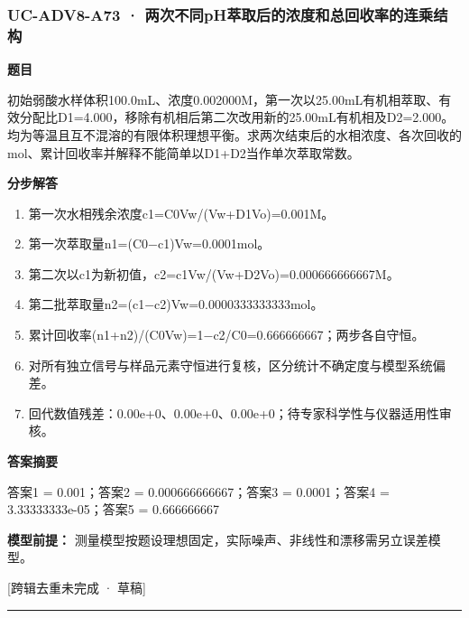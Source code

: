 \documentclass[UTF8,11pt,a4paper]{ctexart}
\begin{document}
\subsubsection*{UC-ADV8-A73 · 两次不同pH萃取后的浓度和总回收率的连乘结构}
\noindent\textbf{题目}\par
初始弱酸水样体积100.0mL、浓度0.002000M，第一次以25.00mL有机相萃取、有效分配比D1=4.000，移除有机相后第二次改用新的25.00mL有机相及D2=2.000。均为等温且互不混溶的有限体积理想平衡。求两次结束后的水相浓度、各次回收的mol、累计回收率并解释不能简单以D1+D2当作单次萃取常数。\par
\medskip\noindent\textbf{分步解答}
\begin{enumerate}
\item 第一次水相残余浓度c1=C0Vw/(Vw+D1Vo)=0.001M。
\item 第一次萃取量n1=(C0−c1)Vw=0.0001mol。
\item 第二次以c1为新初值，c2=c1Vw/(Vw+D2Vo)=0.000666666667M。
\item 第二批萃取量n2=(c1−c2)Vw=0.0000333333333mol。
\item 累计回收率(n1+n2)/(C0Vw)=1−c2/C0=0.666666667；两步各自守恒。
\item 对所有独立信号与样品元素守恒进行复核，区分统计不确定度与模型系统偏差。
\item 回代数值残差：0.00e+0、0.00e+0、0.00e+0；待专家科学性与仪器适用性审核。
\end{enumerate}
\noindent\textbf{答案摘要}\par
答案1 = 0.001；答案2 = 0.000666666667；答案3 = 0.0001；答案4 = 3.33333333e-05；答案5 = 0.666666667\par
\noindent\textbf{模型前提：}
测量模型按题设理想固定，实际噪声、非线性和漂移需另立误差模型。\par
\noindent\textcolor{red!65!black}{[跨辑去重未完成 · 草稿]} \par
\medskip\hrule\medskip
{}
\end{document}
